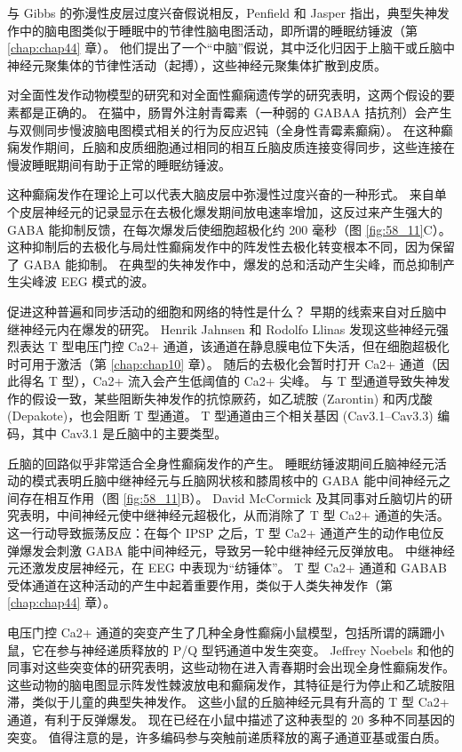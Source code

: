 与 Gibbs 的弥漫性皮层过度兴奋假说相反，Penfield 和 Jasper 指出，典型失神发作中的脑电图类似于睡眠中的节律性脑电图活动，即所谓的睡眠纺锤波（第 \ref{chap:chap44} 章）。
他们提出了一个“中脑”假说，其中泛化归因于上脑干或丘脑中神经元聚集体的节律性活动（起搏），这些神经元聚集体扩散到皮质。


对全面性发作动物模型的研究和对全面性癫痫遗传学的研究表明，这两个假设的要素都是正确的。
在猫中，肠胃外注射青霉素（一种弱的 GABAA 拮抗剂）会产生与双侧同步慢波脑电图模式相关的行为反应迟钝（全身性青霉素癫痫）。
在这种癫痫发作期间，丘脑和皮质细胞通过相同的相互丘脑皮质连接变得同步，这些连接在慢波睡眠期间有助于正常的睡眠纺锤波。


这种癫痫发作在理论上可以代表大脑皮层中弥漫性过度兴奋的一种形式。
来自单个皮层神经元的记录显示在去极化爆发期间放电速率增加，这反过来产生强大的 GABA 能抑制反馈，在每次爆发后使细胞超极化约 200 毫秒（图 \ref{fig:58_11}C）。
这种抑制后的去极化与局灶性癫痫发作中的阵发性去极化转变根本不同，因为保留了 GABA 能抑制。
在典型的失神发作中，爆发的总和活动产生尖峰，而总抑制产生尖峰波 EEG 模式的波。


促进这种普遍和同步活动的细胞和网络的特性是什么？
早期的线索来自对丘脑中继神经元内在爆发的研究。
Henrik Jahnsen 和 Rodolfo Llinas 发现这些神经元强烈表达 T 型电压门控 Ca2+ 通道，该通道在静息膜电位下失活，但在细胞超极化时可用于激活（第 \ref{chap:chap10} 章）。
随后的去极化会暂时打开 Ca2+ 通道（因此得名 T 型），Ca2+ 流入会产生低阈值的 Ca2+ 尖峰。
与 T 型通道导致失神发作的假设一致，某些阻断失神发作的抗惊厥药，如乙琥胺 (Zarontin) 和丙戊酸 (Depakote)，也会阻断 T 型通道。
T 型通道由三个相关基因 (Cav3.1–Cav3.3) 编码，其中 Cav3.1 是丘脑中的主要类型。


丘脑的回路似乎非常适合全身性癫痫发作的产生。
睡眠纺锤波期间丘脑神经元活动的模式表明丘脑中继神经元与丘脑网状核和膝周核中的 GABA 能中间神经元之间存在相互作用（图 \ref{fig:58_11}B）。
David McCormick 及其同事对丘脑切片的研究表明，中间神经元使中继神经元超极化，从而消除了 T 型 Ca2+ 通道的失活。
这一行动导致振荡反应：在每个 IPSP 之后，T 型 Ca2+ 通道产生的动作电位反弹爆发会刺激 GABA 能中间神经元，导致另一轮中继神经元反弹放电。
中继神经元还激发皮层神经元，在 EEG 中表现为“纺锤体”。
T 型 Ca2+ 通道和 GABAB 受体通道在这种活动的产生中起着重要作用，类似于人类失神发作（第 \ref{chap:chap44} 章）。


电压门控 Ca2+ 通道的突变产生了几种全身性癫痫小鼠模型，包括所谓的蹒跚小鼠，它在参与神经递质释放的 P/Q 型钙通道中发生突变。
Jeffrey Noebels 和他的同事对这些突变体的研究表明，这些动物在进入青春期时会出现全身性癫痫发作。
这些动物的脑电图显示阵发性棘波放电和癫痫发作，其特征是行为停止和乙琥胺阻滞，类似于儿童的典型失神发作。
这些小鼠的丘脑神经元具有升高的 T 型 Ca2+ 通道，有利于反弹爆发。
现在已经在小鼠中描述了这种表型的 20 多种不同基因的突变。
值得注意的是，许多编码参与突触前递质释放的离子通道亚基或蛋白质。



